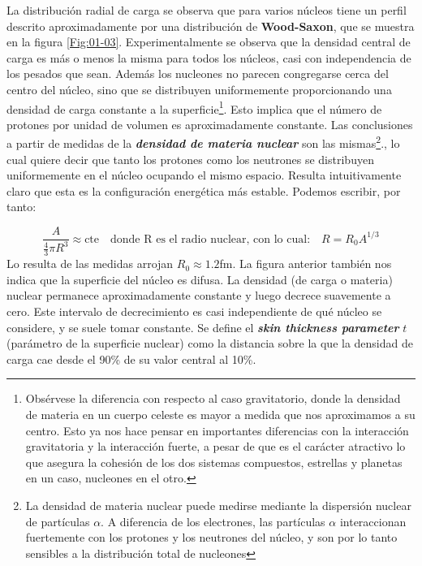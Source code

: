 La distribución radial de carga se observa que para varios núcleos tiene un perfil descrito aproximadamente por una distribución de \textbf{Wood-Saxon}, que se muestra en la figura \ref{Fig:01-03}. Experimentalmente se observa que la densidad central de carga es más o menos la misma para todos los núcleos, casi con independencia de los pesados que sean. Además los nucleones no parecen congregarse cerca del centro del núcleo, sino que se distribuyen uniformemente proporcionando una densidad de carga constante a la superficie\footnote{Obsérvese la diferencia con respecto al caso gravitatorio, donde la densidad de materia en un cuerpo celeste es mayor a medida que nos aproximamos a su centro. Esto ya nos hace pensar en importantes diferencias con la interacción gravitatoria y la interacción fuerte, a pesar de que es el carácter atractivo lo que asegura la cohesión de los dos sistemas compuestos, estrellas y planetas en un caso, nucleones en el otro.}. Esto implica que el número de protones por unidad de volumen es aproximadamente constante. Las conclusiones a partir de medidas de la \textbf{\textit{densidad de materia nuclear}} son las mismas\footnote{La densidad de materia nuclear puede medirse mediante la dispersión nuclear de partículas $\alpha$. A diferencia de los electrones, las partículas $\alpha$ interaccionan fuertemente con los protones y los neutrones del núcleo, y son por lo tanto sensibles a la distribución total de nucleones}., lo cual quiere decir que tanto los protones como los neutrones se distribuyen uniformemente en el núcleo ocupando el mismo espacio. Resulta intuitivamente claro que esta es la configuración energética más estable. Podemos escribir, por tanto:

\begin{equation}
	\frac{A}{\frac{4}{3}\pi R^3} \approx \text{cte} \quad \text{donde R es el radio nuclear, con lo cual:} \quad R=R_0 A^{1/3}
\end{equation}
Lo resulta de las medidas arrojan $R_0\approx1.2$fm. La figura anterior también nos indica que la superficie del núcleo es difusa. La densidad (de carga o materia) nuclear permanece aproximadamente constante y luego decrece suavemente a cero. Este intervalo de decrecimiento es casi independiente de qué núcleo se considere, y se suele tomar constante. Se define el \textbf{\textit{skin thickness parameter}} $t$ (parámetro de la superficie nuclear) como la distancia sobre la que la densidad de carga cae desde el 90\% de su valor central al 10\%.





